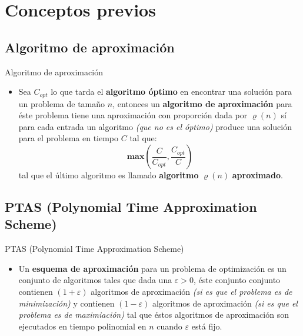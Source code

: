\renewcommand{\sectiontitle}{Conceptos previos}
\section{\sectiontitle}

\renewcommand{\subsectiontitle}{Algoritmo de aproximación}
\subsection{\subsectiontitle}
\begin{frame}{\subsectiontitle}
    \begin{itemize}
        \item Sea \(C_{opt}\) lo que tarda el \textbf{algoritmo óptimo} en encontrar una solución para un problema
        de tamaño \(n\), entonces un \textbf{algoritmo de aproximación} para éste problema tiene una aproximación 
        con proporción dada por \(\varrho\left(n\right)\) sí para cada entrada un algoritmo 
        \textit{(que no es el óptimo)} produce una solución para el problema en tiempo \(C\) tal que:
        \[
            \mathbf{max}\left(\frac{C}{C_{opt}}, \frac{C_{opt}}{C}\right)  
        \]
        tal que el último algoritmo es llamado \textbf{algoritmo} \(\varrho\left(n\right)\) \textbf{aproximado}.
    \end{itemize}
\end{frame}
\renewcommand{\subsectiontitle}{PTAS (Polynomial Time Approximation Scheme)}
\subsection{\subsectiontitle}
\begin{frame}{\subsectiontitle}
    \begin{itemize}
        \item Un \textbf{esquema de aproximación} para un problema de optimización es un conjunto de algoritmos tales que dada 
        una \(\varepsilon > 0\), éste conjunto conjunto contienen \((1 + \varepsilon)\) algoritmos de aproximación 
        \textit{(si es que el problema es de minimización)} y contienen \((1 - \varepsilon)\) algoritmos de aproximación 
        \textit{(si es que el problema es de maximiación)} tal que éstos algoritmos de aproximación son ejecutados en 
        tiempo polinomial en \(n\) cuando \(\varepsilon\) está fijo.
    \end{itemize}
\end{frame}
\renewcommand{\subsectiontitle}{FPTAS (Fully Polynomial Time Approximation Scheme)}
